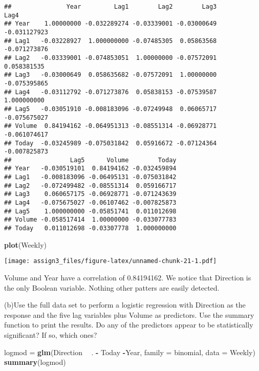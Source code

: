\documentclass[]{article}
\newenvironment{Shaded}{\begin{snugshade}}{\end{snugshade}}
\newcommand{\DataTypeTok}[1]{\textcolor[rgb]{0.13,0.29,0.53}{#1}}
\newcommand{\KeywordTok}[1]{\textcolor[rgb]{0.13,0.29,0.53}{\textbf{#1}}}
\newcommand{\NormalTok}[1]{#1}
\newcommand{\OperatorTok}[1]{\textcolor[rgb]{0.81,0.36,0.00}{\textbf{#1}}}
\newcommand{\StringTok}[1]{\textcolor[rgb]{0.31,0.60,0.02}{#1}}
\begin{document}
\begin{verbatim}
##               Year         Lag1        Lag2        Lag3         Lag4
## Year    1.00000000 -0.032289274 -0.03339001 -0.03000649 -0.031127923
## Lag1   -0.03228927  1.000000000 -0.07485305  0.05863568 -0.071273876
## Lag2   -0.03339001 -0.074853051  1.00000000 -0.07572091  0.058381535
## Lag3   -0.03000649  0.058635682 -0.07572091  1.00000000 -0.075395865
## Lag4   -0.03112792 -0.071273876  0.05838153 -0.07539587  1.000000000
## Lag5   -0.03051910 -0.008183096 -0.07249948  0.06065717 -0.075675027
## Volume  0.84194162 -0.064951313 -0.08551314 -0.06928771 -0.061074617
## Today  -0.03245989 -0.075031842  0.05916672 -0.07124364 -0.007825873
##                Lag5      Volume        Today
## Year   -0.030519101  0.84194162 -0.032459894
## Lag1   -0.008183096 -0.06495131 -0.075031842
## Lag2   -0.072499482 -0.08551314  0.059166717
## Lag3    0.060657175 -0.06928771 -0.071243639
## Lag4   -0.075675027 -0.06107462 -0.007825873
## Lag5    1.000000000 -0.05851741  0.011012698
## Volume -0.058517414  1.00000000 -0.033077783
## Today   0.011012698 -0.03307778  1.000000000
\end{verbatim}

\begin{Shaded}
\begin{Highlighting}[]
\KeywordTok{plot}\NormalTok{(Weekly)}
\end{Highlighting}
\end{Shaded}

\texttt{[image: assign3\_files/figure-latex/unnamed-chunk-21-1.pdf]}

Volume and Year have a correlation of 0.84194162. We notice that
Direction is the only Boolean variable. Nothing other patters are easily
detected.

(b)Use the full data set to perform a logistic regression with Direction
as the response and the five lag variables plus Volume as predictors.
Use the summary function to print the results. Do any of the predictors
appear to be statistically significant? If so, which ones?

\begin{Shaded}
\begin{Highlighting}[]
\NormalTok{logmod =}\StringTok{ }\KeywordTok{glm}\NormalTok{(Direction }\OperatorTok{~}\StringTok{ }\NormalTok{. }\OperatorTok{-}\StringTok{ }\NormalTok{Today }\OperatorTok{-}\NormalTok{Year, }\DataTypeTok{family =}\NormalTok{ binomial, }\DataTypeTok{data =}\NormalTok{ Weekly)}
\KeywordTok{summary}\NormalTok{(logmod)}
\end{Highlighting}
\end{Shaded}
\end{document}
